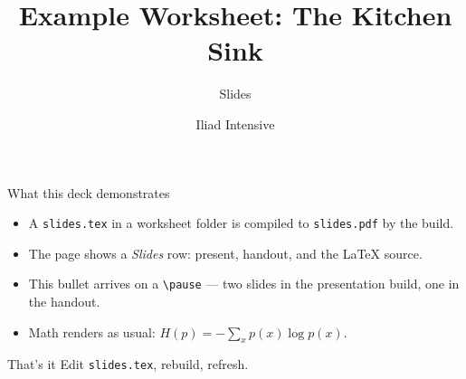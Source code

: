 \documentclass{beamer}
\title{Example Worksheet: The Kitchen Sink}
\subtitle{Slides}
\author{Iliad Intensive}
\begin{document}
\begin{frame}
  \titlepage
\end{frame}

\begin{frame}{What this deck demonstrates}
  \begin{itemize}
    \item A \texttt{slides.tex} in a worksheet folder is compiled to
          \texttt{slides.pdf} by the build.
    \item The page shows a \emph{Slides} row: present, handout, and the LaTeX
          source.
    \pause
    \item This bullet arrives on a \texttt{\textbackslash pause} --- two slides
          in the presentation build, one in the handout.
    \item Math renders as usual: $\displaystyle H(p) = -\sum_x p(x)\log p(x)$.
  \end{itemize}
\end{frame}

\begin{frame}{That's it}
  \centering \Large Edit \texttt{slides.tex}, rebuild, refresh.
\end{frame}
\end{document}
